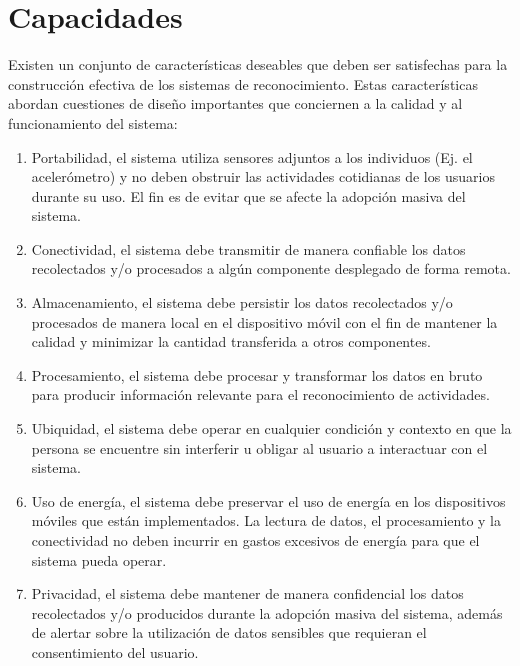 \section{Capacidades }

Existen un conjunto de características deseables que deben ser satisfechas
para la construcción efectiva de los sistemas de reconocimiento. Estas
características abordan cuestiones de diseño importantes que conciernen
a la calidad y al funcionamiento del sistema:
\begin{enumerate}
\item Portabilidad, el sistema utiliza sensores adjuntos a los individuos
(Ej. el acelerómetro) y no deben obstruir las actividades cotidianas
de los usuarios durante su uso. El fin es de evitar que se afecte
la adopción masiva del sistema. 
\item Conectividad, el sistema debe transmitir de manera confiable los datos
recolectados y/o procesados a algún componente desplegado de forma
remota. 
\item Almacenamiento, el sistema debe persistir los datos recolectados y/o
procesados de manera local en el dispositivo móvil con el fin de mantener
la calidad y minimizar la cantidad transferida a otros componentes.
\item Procesamiento, el sistema debe procesar y transformar los datos en
bruto para producir información relevante para el reconocimiento de
actividades.
\item Ubiquidad, el sistema debe operar en cualquier condición y contexto
en que la persona se encuentre sin interferir u obligar al usuario
a interactuar con el sistema.
\item Uso de energía, el sistema debe preservar el uso de energía en los
dispositivos móviles que están implementados. La lectura de datos,
el procesamiento y la conectividad no deben incurrir en gastos excesivos
de energía para que el sistema pueda operar.
\item Privacidad, el sistema debe mantener de manera confidencial los datos
recolectados y/o producidos durante la adopción masiva del sistema,
además de alertar sobre la utilización de datos sensibles que requieran
el consentimiento del usuario.
\end{enumerate}

